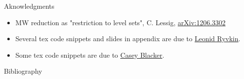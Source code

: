 \documentclass[beamer,10pt]{standalone}
\begin{document}


\begin{frame}[t,allowframebreaks]{Aknowledgments}
	\begin{itemize}[label=$\star$]
		\item MW reduction as "restriction to level sets", C. Lessig,
			\href{https://arxiv.org/abs/1206.3302}{arXiv:1206.3302}
		\item Several tex code snippets and slides in appendix are due to \href{https://www.ryvkin.eu/}{Leonid Ryvkin}.
		\item Some tex code snippets are due to \href{https://math.gmu.edu/~cblacke/}{Casey Blacker}.
		
	\end{itemize}
\end{frame}



\begin{frame}[t,allowframebreaks]{Bibliography}
	\nocite{Miti2025}
	\printbibliography
\end{frame}


\end{document}
